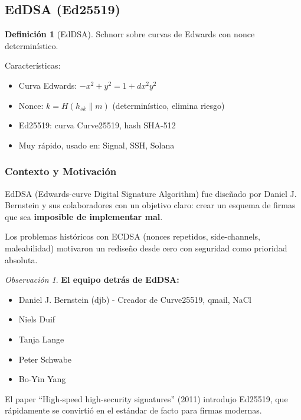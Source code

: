 \documentclass[11pt,a4paper,twoside,openright]{book}
\theoremstyle{definition}
\newtheorem{definition}{Definición}[chapter]
\theoremstyle{plain}
\theoremstyle{remark}
\newtheorem{remark}{Observación}[chapter]
\begin{document}

\subsection{EdDSA (Ed25519)}

\begin{definition}[EdDSA]
Schnorr sobre curvas de Edwards con nonce determinístico.
\end{definition}

Características:
\begin{itemize}
    \item Curva Edwards: $-x^2 + y^2 = 1 + dx^2y^2$
    \item Nonce: $k = H(h_{sk} \| m)$ (determinístico, elimina riesgo)
    \item Ed25519: curva Curve25519, hash SHA-512
    \item Muy rápido, usado en: Signal, SSH, Solana
\end{itemize}

\subsubsection{Contexto y Motivación}

\begin{intuicion}
EdDSA (Edwards-curve Digital Signature Algorithm) fue diseñado por Daniel J. Bernstein y sus colaboradores con un objetivo claro: crear un esquema de firmas que sea \textbf{imposible de implementar mal}.

Los problemas históricos con ECDSA (nonces repetidos, side-channels, maleabilidad) motivaron un rediseño desde cero con seguridad como prioridad absoluta.
\end{intuicion}

\begin{remark}
\textbf{El equipo detrás de EdDSA:}
\begin{itemize}
    \item Daniel J. Bernstein (djb) - Creador de Curve25519, qmail, NaCl
    \item Niels Duif
    \item Tanja Lange
    \item Peter Schwabe
    \item Bo-Yin Yang
\end{itemize}

El paper ``High-speed high-security signatures'' (2011) introdujo Ed25519, que rápidamente se convirtió en el estándar de facto para firmas modernas.
\end{remark}
\end{document}
